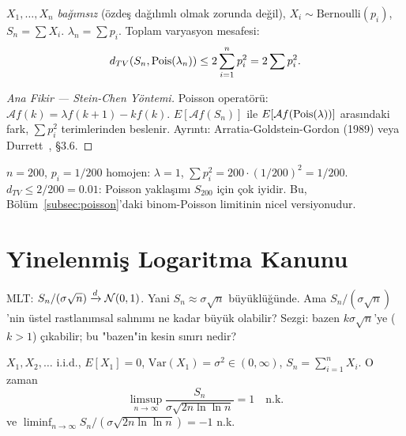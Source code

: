 \begin{teorem}
\label{thm:le_cam}
$X_1, \ldots, X_n$ \emph{bağımsız} (özdeş dağılımlı olmak zorunda değil),
$X_i \sim \mathrm{Bernoulli}(p_i)$, $S_n = \sum X_i$.
$\lambda_n = \sum p_i$. Toplam varyasyon mesafesi:
\[
  d_{TV}(S_n, \operatorname{Pois}(\lambda_n)) \leq 2\sum_{i=1}^n p_i^2 = 2\sum p_i^2.
\]
\end{teorem}

\begin{proof}[Ana Fikir --- Stein-Chen Yöntemi]
Poisson operatörü: $\mathcal{A}f(k) = \lambda f(k+1) - kf(k)$.
$E[\mathcal{A}f(S_n)]$ ile $E[\mathcal{A}f(\operatorname{Pois}(\lambda))]$ arasındaki fark,
$\sum p_i^2$ terimlerinden beslenir.
Ayrıntı: Arratia-Goldstein-Gordon (1989) veya Durrett~\cite{Durrett2019}, §3.6.
\end{proof}

\begin{ornek}
$n = 200$, $p_i = 1/200$ homojen: $\lambda = 1$, $\sum p_i^2 = 200 \cdot (1/200)^2 = 1/200$.
$d_{TV} \leq 2/200 = 0.01$: Poisson yaklaşımı $S_{200}$ için çok iyidir.
Bu, Bölüm~\ref{subsec:poisson}'daki binom-Poisson limitinin nicel versiyonudur.
\end{ornek}

\section{Yinelenmiş Logaritma Kanunu}
\label{sec:yinelenmis_log}

\begin{motivasyon}
MLT: $S_n/({\sigma\sqrt{n}}) \xrightarrow{d} \mathcal{N}(0,1)$. Yani $S_n \approx \sigma\sqrt{n}$ büyüklüğünde.
Ama $S_n/(\sigma\sqrt{n})$'nin üstel rastlanımsal salınımı ne kadar büyük olabilir?
Sezgi: bazen $k\sigma\sqrt{n}$'ye ($k > 1$) çıkabilir; bu "bazen"in kesin sınırı nedir?
\end{motivasyon}

\begin{teorem}
\label{thm:ylk}
$X_1, X_2, \ldots$ i.i.d., $E[X_1] = 0$, $\mathrm{Var}(X_1) = \sigma^2 \in (0,\infty)$,
$S_n = \sum_{i=1}^n X_i$. O zaman
\[
  \limsup_{n\to\infty} \frac{S_n}{\sigma\sqrt{2n\ln\ln n}} = 1 \quad \text{n.k.}
\]
ve $\liminf_{n\to\infty} S_n/(\sigma\sqrt{2n\ln\ln n}) = -1$ n.k.
\end{teorem}

